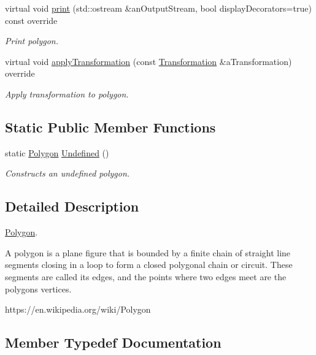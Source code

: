 \begin{DoxyCompactItemize}
virtual void \hyperlink{classostk_1_1math_1_1geom_1_1d3_1_1objects_1_1_polygon_abe478a380cdd22efb082590fda923201}{print} (std\+::ostream \&an\+Output\+Stream, bool display\+Decorators=true) const override
\begin{DoxyCompactList}\small\item\em Print polygon. \end{DoxyCompactList}\item 
virtual void \hyperlink{classostk_1_1math_1_1geom_1_1d3_1_1objects_1_1_polygon_abf60fe8602485822f8f07c01f6980cf5}{apply\+Transformation} (const \hyperlink{classostk_1_1math_1_1geom_1_1d3_1_1_transformation}{Transformation} \&a\+Transformation) override
\begin{DoxyCompactList}\small\item\em Apply transformation to polygon. \end{DoxyCompactList}\end{DoxyCompactItemize}
\subsection*{Static Public Member Functions}
\begin{DoxyCompactItemize}
\item 
static \hyperlink{classostk_1_1math_1_1geom_1_1d3_1_1objects_1_1_polygon}{Polygon} \hyperlink{classostk_1_1math_1_1geom_1_1d3_1_1objects_1_1_polygon_ae8e72528e193664f1466ba7e6e3e18ae}{Undefined} ()
\begin{DoxyCompactList}\small\item\em Constructs an undefined polygon. \end{DoxyCompactList}\end{DoxyCompactItemize}


\subsection{Detailed Description}
\hyperlink{classostk_1_1math_1_1geom_1_1d3_1_1objects_1_1_polygon}{Polygon}. 

A polygon is a plane figure that is bounded by a finite chain of straight line segments closing in a loop to form a closed polygonal chain or circuit. These segments are called its edges, and the points where two edges meet are the polygon\textquotesingle{}s vertices.

https\+://en.wikipedia.\+org/wiki/\+Polygon 

\subsection{Member Typedef Documentation}
\mbox{\label{classostk_1_1math_1_1geom_1_1d3_1_1objects_1_1_polygon_a58c9a7e93e903b2226804116cce4f1ec}} 
